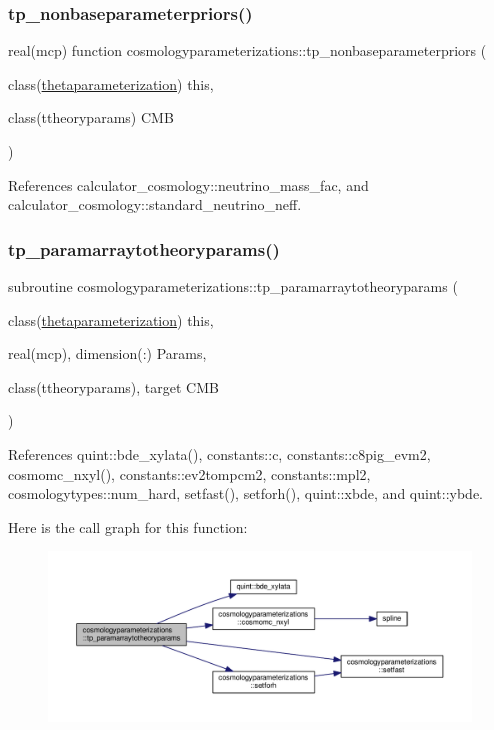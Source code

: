 \subsubsection{\texorpdfstring{tp\+\_\+nonbaseparameterpriors()}{tp\_nonbaseparameterpriors()}}
{\footnotesize\ttfamily real(mcp) function cosmologyparameterizations\+::tp\+\_\+nonbaseparameterpriors (\begin{DoxyParamCaption}\item[{class(\mbox{\hyperlink{structcosmologyparameterizations_1_1thetaparameterization}{thetaparameterization}})}]{this,  }\item[{class(ttheoryparams)}]{C\+MB }\end{DoxyParamCaption})\hspace{0.3cm}{\ttfamily [private]}}



References calculator\+\_\+cosmology\+::neutrino\+\_\+mass\+\_\+fac, and calculator\+\_\+cosmology\+::standard\+\_\+neutrino\+\_\+neff.

\mbox{\label{namespacecosmologyparameterizations_afad6169e49a1cd77b2d4aa147b2db537}} 
\subsubsection{\texorpdfstring{tp\+\_\+paramarraytotheoryparams()}{tp\_paramarraytotheoryparams()}}
{\footnotesize\ttfamily subroutine cosmologyparameterizations\+::tp\+\_\+paramarraytotheoryparams (\begin{DoxyParamCaption}\item[{class(\mbox{\hyperlink{structcosmologyparameterizations_1_1thetaparameterization}{thetaparameterization}})}]{this,  }\item[{real(mcp), dimension(\+:)}]{Params,  }\item[{class(ttheoryparams), target}]{C\+MB }\end{DoxyParamCaption})\hspace{0.3cm}{\ttfamily [private]}}



References quint\+::bde\+\_\+xylata(), constants\+::c, constants\+::c8pig\+\_\+evm2, cosmomc\+\_\+nxyl(), constants\+::ev2tompcm2, constants\+::mpl2, cosmologytypes\+::num\+\_\+hard, setfast(), setforh(), quint\+::xbde, and quint\+::ybde.

Here is the call graph for this function\+:
\nopagebreak
\begin{figure}[H]
\begin{center}
\leavevmode
\includegraphics[width=350pt]{namespacecosmologyparameterizations_afad6169e49a1cd77b2d4aa147b2db537_cgraph}
\end{center}
\end{figure}
